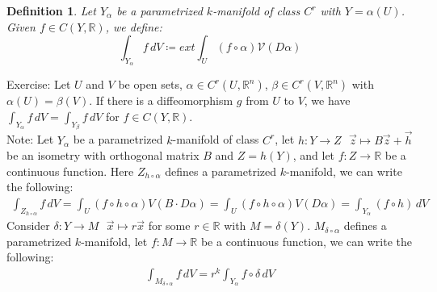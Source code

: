 \documentclass[11pt,oneside]{book}
\theoremstyle{break}
\theoremstyle{break}
\newtheorem{defn}{Definition}[corL]
\newcommand{\R}{\mathbb{R}}
\newcommand{\note}{\color{red}Note: \color{black}}
\newcommand{\exercise}{\color{green}Exercise: \color{black}}
\begin{document}
\begin{defn}
Let $Y_\alpha$ be a parametrized $k$-manifold of class $C^r$ with $Y = \alpha(U)$. Given $f \in C(Y,\R)$, we define: $$\int_{Y_\alpha} f\, dV \coloneqq ext \int_U (f\circ \alpha) \mathcal{V}(D\alpha)$$
\end{defn}
\hfill\break
\exercise Let $U$ and $V$ be open sets, $\alpha \in C^r(U,\R^n)$, $\beta\in C^r(V,\R^n)$ with $\alpha(U) = \beta(V)$. If there is a diffeomorphism $g$ from $U$ to $V$, we have $\int_{Y_\alpha} f\, dV = \int_{Y_\beta} f \, dV$ for $f \in C(Y,\R)$. \\

\note Let $Y_\alpha$ be a parametrized $k$-manifold of class $C^r$, let $h:Y \to Z \ \ \ \vec{z}\mapsto B\vec{z}+\vec{h}$ be an isometry with orthogonal matrix $B$ and $Z = h(Y)$, and let $f:Z \to \R$ be a continuous function. Here $Z_{h\circ \alpha}$ defines a parametrized $k$-manifold, we can write the following:
\begin{align*}
\int_{Z_{h\circ \alpha}}f\, dV = \int_U (f\circ h \circ \alpha) V(B \cdot D\alpha) = \int_U(f\circ h\circ \alpha) V(D\alpha) = \int_{Y_\alpha} (f\circ h) \, dV
\end{align*}
Consider $\delta:Y \to M \ \ \ \vec{x}\mapsto r\vec{x}$ for some $r \in \R$ with $M = \delta(Y)$. $M_{\delta \circ \alpha}$ defines a parametrized $k$-manifold, let $f:M \to \R$ be a continuous function, we can write the following:
\begin{align*}
\int_{M_{\delta\circ \alpha}}f\, dV =r^k \int_{Y_\alpha} f\circ \delta\, dV
\end{align*}
\end{document}
